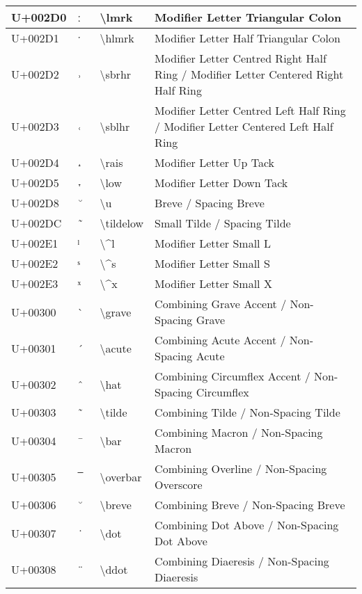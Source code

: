 \begin{table}[h]
\begin{tabulary}{\linewidth}{|L|L|L|L|}
\hline
U+002D0 & ː & {\textbackslash}lmrk & Modifier Letter Triangular Colon \\
\hline
U+002D1 & ˑ & {\textbackslash}hlmrk & Modifier Letter Half Triangular Colon \\
\hline
U+002D2 & ˒ & {\textbackslash}sbrhr & Modifier Letter Centred Right Half Ring / Modifier Letter Centered Right Half Ring \\
\hline
U+002D3 & ˓ & {\textbackslash}sblhr & Modifier Letter Centred Left Half Ring / Modifier Letter Centered Left Half Ring \\
\hline
U+002D4 & ˔ & {\textbackslash}rais & Modifier Letter Up Tack \\
\hline
U+002D5 & ˕ & {\textbackslash}low & Modifier Letter Down Tack \\
\hline
U+002D8 & ˘ & {\textbackslash}u & Breve / Spacing Breve \\
\hline
U+002DC & ˜ & {\textbackslash}tildelow & Small Tilde / Spacing Tilde \\
\hline
U+002E1 & ˡ & {\textbackslash}{\textasciicircum}l & Modifier Letter Small L \\
\hline
U+002E2 & ˢ & {\textbackslash}{\textasciicircum}s & Modifier Letter Small S \\
\hline
U+002E3 & ˣ & {\textbackslash}{\textasciicircum}x & Modifier Letter Small X \\
\hline
U+00300 &  ̀  & {\textbackslash}grave & Combining Grave Accent / Non-Spacing Grave \\
\hline
U+00301 &  ́  & {\textbackslash}acute & Combining Acute Accent / Non-Spacing Acute \\
\hline
U+00302 &  ̂  & {\textbackslash}hat & Combining Circumflex Accent / Non-Spacing Circumflex \\
\hline
U+00303 &  ̃  & {\textbackslash}tilde & Combining Tilde / Non-Spacing Tilde \\
\hline
U+00304 &  ̄  & {\textbackslash}bar & Combining Macron / Non-Spacing Macron \\
\hline
U+00305 &  ̅  & {\textbackslash}overbar & Combining Overline / Non-Spacing Overscore \\
\hline
U+00306 &  ̆  & {\textbackslash}breve & Combining Breve / Non-Spacing Breve \\
\hline
U+00307 &  ̇  & {\textbackslash}dot & Combining Dot Above / Non-Spacing Dot Above \\
\hline
U+00308 &  ̈  & {\textbackslash}ddot & Combining Diaeresis / Non-Spacing Diaeresis \\
\hline

\end{tabulary}
\end{table}
